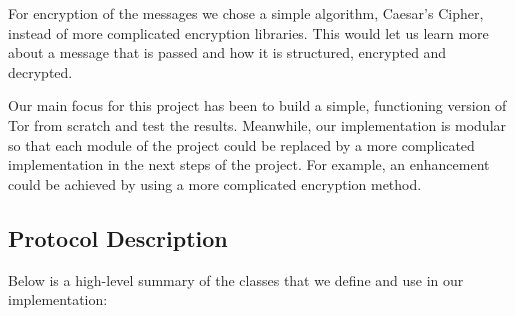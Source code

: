 \documentclass{article}
\begin{document}
\vspace{0.3 cm}

\noindent For encryption of the messages we chose a simple algorithm, Caesar's Cipher, instead of more complicated encryption libraries. This would let us learn more about a message that is passed and how it is structured, encrypted and decrypted.\\

\vspace{0.3 cm}

\noindent Our main focus for this project has been to build a simple, functioning version of Tor from scratch and test the results. Meanwhile, our implementation is modular so that each module of the project could be replaced by a more complicated implementation in the next steps of the project. For example, an enhancement could be achieved by using a more complicated encryption method. \\

\vspace{0.3 cm}

\subsection{Protocol Description}
\noindent Below is a high-level summary of the classes that we define and use in our implementation: \\
\end{document}
